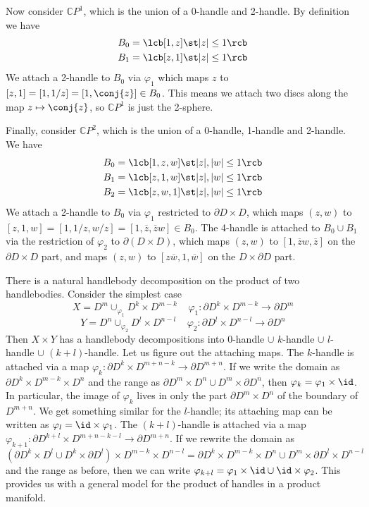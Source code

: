 \begin{example}
Now consider $\mathbb CP^1$, which is the union of a 0-handle and 2-handle. By definition we have
\begin{align*}
B_0 &= \lcb [1,z] \st |z|\leq 1 \rcb \\
B_1 &= \lcb [z,1] \st |z|\leq 1 \rcb 
\end{align*}
We attach a 2-handle to $B_0$ via $\varphi_1$ which maps $z$ to $[z,1] = [1,1/z] = [1,\conj{z}] \in B_0$. This means we attach two discs along the map $z \mapsto \conj{z}$, so $\mathbb CP^1$ is just the 2-sphere.

Finally, consider $\mathbb CP^2$, which is the union of a 0-handle, 1-handle and 2-handle. We have
\begin{align*}
B_0 &= \lcb [1,z,w] \st |z|,|w| \leq 1 \rcb \\
B_1 &= \lcb [z,1,w] \st |z|,|w| \leq 1 \rcb \\
B_2 &= \lcb [z,w,1] \st |z|,|w| \leq 1 \rcb
\end{align*}
We attach a 2-handle to $B_0$ via $\varphi_1$ restricted to $\partial D \times D$, which maps $(z,w)$ to $[z,1,w] = [1,1/z,w/z] = [1,\overline z,\overline zw] \in B_0$. The 4-handle is attached to $B_0 \cup B_1$ via the restriction of $\varphi_2$ to $\partial(D \times D)$, which maps $(z,w)$ to $[1,\overline zw,\overline z]$ on the $\partial D \times D$ part, and maps $(z,w)$ to $[z\overline w,1,\overline w]$ on the $D \times \partial D$ part.
\end{example}


There is a natural handlebody decomposition on the product of two handlebodies. Consider the simplest case
\[ X = D^m \cup_{\varphi_1} D^k \times D^{m-k} \ \ \ \ \ \varphi_1 : \partial D^k \times D^{m-k} \rightarrow \partial D^m \]
\[ Y = D^n \cup_{\varphi_2} D^l \times D^{n-l} \ \ \ \ \ \varphi_2 : \partial D^l \times D^{n-l} \rightarrow \partial D^n \]
Then $X \times Y$ has a handlebody decompositions into 0-handle $\cup$ $k$-handle $\cup$ $l$-handle $\cup$ $(k+l)$-handle. Let us figure out the attaching maps. The $k$-handle is attached via a map $\varphi_k : \partial D^k \times D^{m+n-k} \rightarrow \partial D^{m+n}$. If we write the domain as $\partial D^k \times D^{m-k} \times D^n$ and the range as $\partial D^m \times D^n \cup D^m \times \partial D^n$, then $\varphi_k = \varphi_1 \times \id$. In particular, the image of $\varphi_k$ lives in only the part $\partial D^m \times D^n$ of the boundary of $D^{m+n}$. We get something similar for the $l$-handle; its attaching map can be written as $\varphi_l = \id \times \varphi_1$. The $(k+l)$-handle is attached via a map $\varphi_{k+1} : \partial D^{k+l} \times D^{m+n-k-l} \rightarrow \partial D^{m+n}$. If we rewrite the domain as 
\[ \left( \partial D^k \times D^l \cup D^k \times \partial D^l \right) \times D^{m-k} \times D^{n-l} = \partial D^k \times D^{m-k} \times D^n \cup D^m \times \partial D^l \times D^{n-l} \]
and the range as before, then we can write $\varphi_{k+l} = \varphi_1 \times \id \cup \id \times \varphi_2$. This provides us with a general model for the product of handles in a product manifold.

